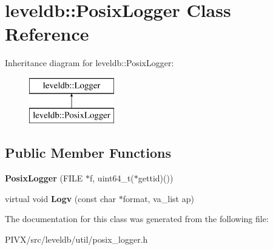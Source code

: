 \hypertarget{classleveldb_1_1_posix_logger}{}\section{leveldb\+:\+:Posix\+Logger Class Reference}
\label{classleveldb_1_1_posix_logger}
Inheritance diagram for leveldb\+:\+:Posix\+Logger\+:\begin{figure}[H]
\begin{center}
\leavevmode
\includegraphics[height=2.000000cm]{classleveldb_1_1_posix_logger}
\end{center}
\end{figure}
\subsection*{Public Member Functions}
\begin{DoxyCompactItemize}
\item 
\mbox{\label{classleveldb_1_1_posix_logger_a9c498babc43c3cfb5f863a252ce5d1d1}} 
{\bfseries Posix\+Logger} (F\+I\+LE $\ast$f, uint64\+\_\+t($\ast$gettid)())
\item 
\mbox{\label{classleveldb_1_1_posix_logger_ae7b521716a3e54c4be187806a81ccf6b}} 
virtual void {\bfseries Logv} (const char $\ast$format, va\+\_\+list ap)
\end{DoxyCompactItemize}


The documentation for this class was generated from the following file\+:\begin{DoxyCompactItemize}
\item 
P\+I\+V\+X/src/leveldb/util/posix\+\_\+logger.\+h\end{DoxyCompactItemize}
